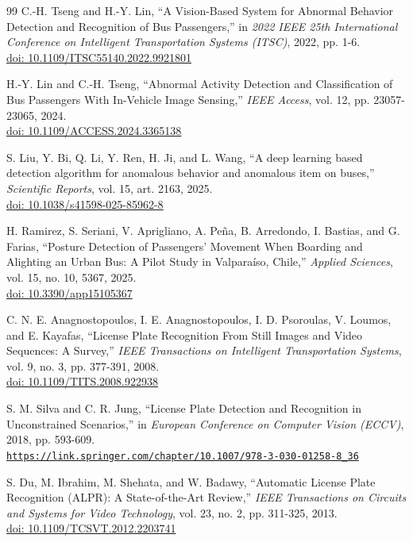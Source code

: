 \documentclass{article}
\renewcommand{\url}[1]{\href{#1}{\nolinkurl{#1}}}
\begin{document}
\begin{thebibliography}{99}
C.-H. Tseng and H.-Y. Lin,
``A Vision-Based System for Abnormal Behavior Detection and Recognition of Bus Passengers,''
in \textit{2022 IEEE 25th International Conference on Intelligent Transportation Systems (ITSC)}, 2022, pp. 1-6.\\
\href{https://doi.org/10.1109/ITSC55140.2022.9921801}{doi: 10.1109/ITSC55140.2022.9921801}

H.-Y. Lin and C.-H. Tseng,
``Abnormal Activity Detection and Classification of Bus Passengers With In-Vehicle Image Sensing,''
\textit{IEEE Access}, vol. 12, pp. 23057-23065, 2024.\\
\href{https://doi.org/10.1109/ACCESS.2024.3365138}{doi: 10.1109/ACCESS.2024.3365138}

S. Liu, Y. Bi, Q. Li, Y. Ren, H. Ji, and L. Wang,
``A deep learning based detection algorithm for anomalous behavior and anomalous item on buses,''
\textit{Scientific Reports}, vol. 15, art. 2163, 2025.\\
\href{https://doi.org/10.1038/s41598-025-85962-8}{doi: 10.1038/s41598-025-85962-8}

H. Ramirez, S. Seriani, V. Aprigliano, A. Pe\~na, B. Arredondo, I. Bastias, and G. Farias,
``Posture Detection of Passengers' Movement When Boarding and Alighting an Urban Bus: A Pilot Study in Valpara\'iso, Chile,''
\textit{Applied Sciences}, vol. 15, no. 10, 5367, 2025.\\
\href{https://doi.org/10.3390/app15105367}{doi: 10.3390/app15105367}

C. N. E. Anagnostopoulos, I. E. Anagnostopoulos, I. D. Psoroulas, V. Loumos, and E. Kayafas,
``License Plate Recognition From Still Images and Video Sequences: A Survey,''
\textit{IEEE Transactions on Intelligent Transportation Systems}, vol. 9, no. 3, pp. 377-391, 2008.\\
\href{https://doi.org/10.1109/TITS.2008.922938}{doi: 10.1109/TITS.2008.922938}

S. M. Silva and C. R. Jung,
``License Plate Detection and Recognition in Unconstrained Scenarios,''
in \textit{European Conference on Computer Vision (ECCV)}, 2018, pp. 593-609.\\
\url{https://link.springer.com/chapter/10.1007/978-3-030-01258-8_36}

S. Du, M. Ibrahim, M. Shehata, and W. Badawy,
``Automatic License Plate Recognition (ALPR): A State-of-the-Art Review,''
\textit{IEEE Transactions on Circuits and Systems for Video Technology}, vol. 23, no. 2, pp. 311-325, 2013.\\
\href{https://doi.org/10.1109/TCSVT.2012.2203741}{doi: 10.1109/TCSVT.2012.2203741}


\end{thebibliography}
\end{document}
